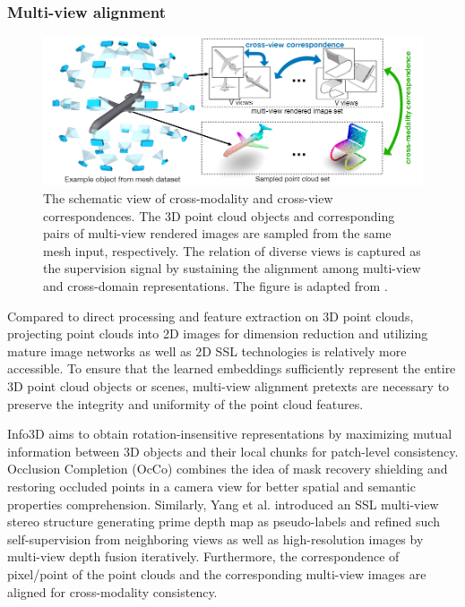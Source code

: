 \documentclass[a4paper,fleqn]{cas-dc}
\begin{document}
\begin{table}[]
{\begin{tabular}{|c|c|c|c|}
    \end{tabular}}

\end{table}

\subsubsection{Multi-view alignment}
\begin{figure}[htbp]
    \centering
    \includegraphics[width=0.97\linewidth]{cross_view.png}
    \caption{The schematic view of cross-modality and cross-view correspondences. The 3D point cloud objects and corresponding pairs of multi-view rendered images are sampled from the same mesh input, respectively. The relation of diverse views is captured as the supervision signal by sustaining the alignment among multi-view and cross-domain representations. The figure is adapted from \citep{jing2021self}.}
    \label{fig:cross_view}
\end{figure}

Compared to direct processing and feature extraction on 3D point clouds, projecting point clouds into 2D images for dimension reduction and utilizing mature image networks as well as 2D SSL technologies is relatively more accessible. To ensure that the learned embeddings sufficiently represent the entire 3D point cloud objects or scenes, multi-view alignment pretexts are necessary to preserve the integrity and uniformity of the point cloud features.

Info3D \citep{sanghi2020info3d} aims to obtain rotation-insensitive representations by maximizing mutual information between 3D objects and their local chunks for patch-level consistency. Occlusion Completion (OcCo) \citep{wang2021unsupervised} combines the idea of mask recovery shielding and restoring occluded points in a camera view for better spatial and semantic properties comprehension. Similarly, Yang et al. \citep{yang2021self} introduced an SSL multi-view stereo structure generating prime depth map as pseudo-labels and refined such self-supervision from neighboring views as well as high-resolution images by multi-view depth fusion iteratively. Furthermore, the correspondence of pixel/point of the point clouds and the corresponding multi-view images are aligned for cross-modality consistency. 
\end{document}
